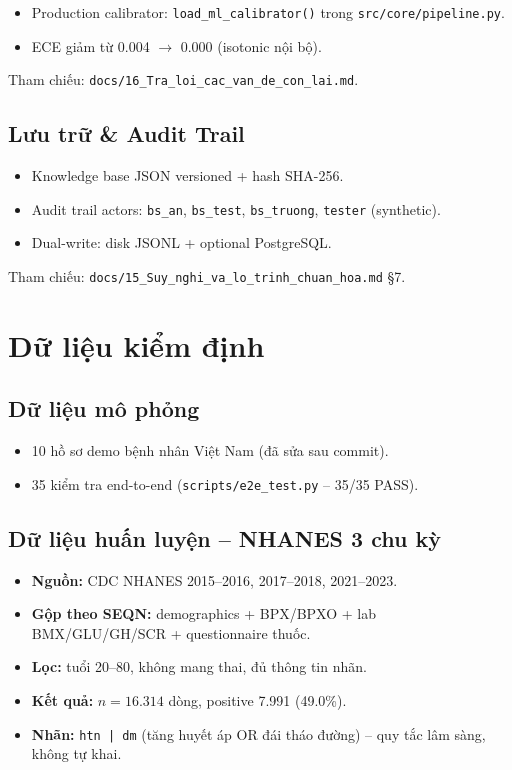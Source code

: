 \documentclass[13pt,a4paper]{article}
\begin{document}
\begin{itemize}
    \item Production calibrator: \texttt{load\_ml\_calibrator()} trong \texttt{src/core/pipeline.py}.
    \item ECE giảm từ 0.004 $\to$ 0.000 (isotonic nội bộ).
\end{itemize}

Tham chiếu: \texttt{docs/16\_Tra\_loi\_cac\_van\_de\_con\_lai.md}.

\subsection{Lưu trữ \& Audit Trail}

\begin{itemize}
    \item Knowledge base JSON versioned + hash SHA-256.
    \item Audit trail actors: \texttt{bs\_an}, \texttt{bs\_test}, \texttt{bs\_truong}, \texttt{tester} (synthetic).
    \item Dual-write: disk JSONL + optional PostgreSQL.
\end{itemize}

Tham chiếu: \texttt{docs/15\_Suy\_nghi\_va\_lo\_trinh\_chuan\_hoa.md} §7.

\section{Dữ liệu kiểm định}

\subsection{Dữ liệu mô phỏng}

\begin{itemize}
    \item 10 hồ sơ demo bệnh nhân Việt Nam (đã sửa sau commit).
    \item 35 kiểm tra end-to-end (\texttt{scripts/e2e\_test.py} -- 35/35 PASS).
\end{itemize}

\subsection{Dữ liệu huấn luyện -- NHANES 3 chu kỳ}

\begin{itemize}
    \item \textbf{Nguồn:} CDC NHANES 2015--2016, 2017--2018, 2021--2023.
    \item \textbf{Gộp theo SEQN:} demographics + BPX/BPXO + lab BMX/GLU/GH/SCR + questionnaire thuốc.
    \item \textbf{Lọc:} tuổi 20--80, không mang thai, đủ thông tin nhãn.
    \item \textbf{Kết quả:} $n = 16.314$ dòng, positive 7.991 (49.0\%).
    \item \textbf{Nhãn:} \texttt{htn | dm} (tăng huyết áp OR đái tháo đường) -- quy tắc lâm sàng, không tự khai.
\end{itemize}
\end{document}
